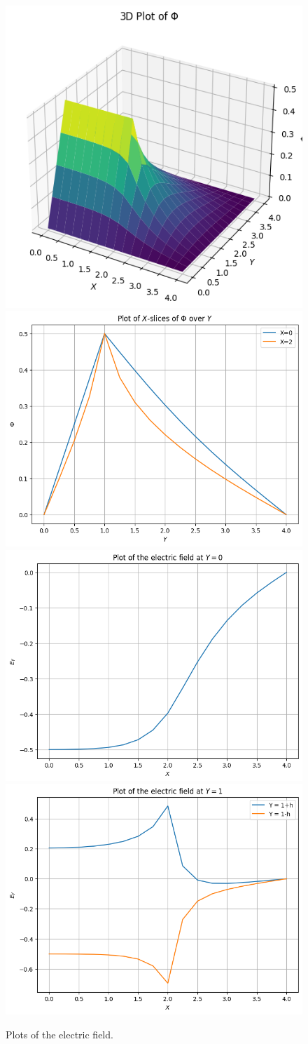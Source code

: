 \documentclass{article}
\begin{document}
\begin{figure}
    \centering
    \includegraphics[width=0.49\linewidth]{images/surfaceplot2.png}
    \includegraphics[width=0.49\linewidth]{images/slice2.png}
    \includegraphics[width=0.49\linewidth]{images/electric2.png}
    \includegraphics[width=0.49\linewidth]{images/plate2.png}
    \caption{Plots of the electric field.}
\end{figure}
\end{document}
